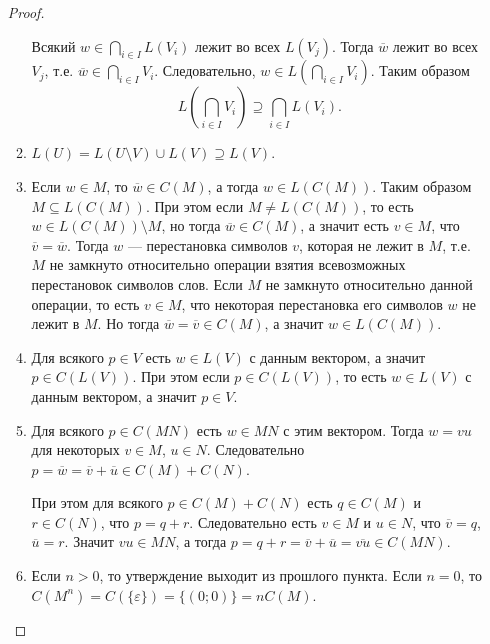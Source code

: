 \documentclass[12pt,a4paper]{article}
\begin{document}
\begin{problem}{8}
\begin{enumerate}
\begin{proof}
\begin{enumerate}
                            Всякий $w \in \bigcap_{i \in I} L(V_i)$ лежит во всех $L(V_j)$. Тогда $\overline{w}$ лежит во всех $V_j$, т.е. $\overline{w} \in \bigcap_{i \in I} V_i$. Следовательно, $w \in L\left(\bigcap_{i \in I} V_i\right)$. Таким образом
                            \[L\left(\bigcap_{i \in I} V_i\right) \supseteq \bigcap_{i \in I} L(V_i).\]

                        \item $L(U) = L(U \setminus V) \cup L(V) \supseteq L(V)$.
                        
                        \item Если $w \in M$, то $\overline{w} \in C(M)$, а тогда $w \in L(C(M))$. Таким образом $M \subseteq L(C(M))$. При этом если $M \neq L(C(M))$, то есть $w \in L(C(M)) \setminus M$, но тогда $\overline{w} \in C(M)$, а значит есть $v \in M$, что $\overline{v} = \overline{w}$. Тогда $w$ --- перестановка символов $v$, которая не лежит в $M$, т.е. $M$ не замкнуто относительно операции взятия всевозможных перестановок символов слов. Если $M$ не замкнуто относительно данной операции, то есть $v \in M$, что некоторая перестановка его символов $w$ не лежит в $M$. Но тогда $\overline{w} = \overline{v} \in C(M)$, а значит $w \in L(C(M))$.

                        \item Для всякого $p \in V$ есть $w \in L(V)$ с данным вектором, а значит $p \in C(L(V))$. При этом если $p \in C(L(V))$, то есть $w \in L(V)$ с данным вектором, а значит $p \in V$.

                        \item Для всякого $p \in C(MN)$ есть $w \in MN$ с этим вектором. Тогда $w = vu$ для некоторых $v \in M$, $u \in N$. Следовательно $p = \overline{w} = \overline{v} + \overline{u} \in C(M) + C(N)$.

                            При этом для всякого $p \in C(M) + C(N)$ есть $q \in C(M)$ и $r \in C(N)$, что $p = q + r$. Следовательно есть $v \in M$ и $u \in N$, что $\overline{v} = q$, $\overline{u} = r$. Значит $vu \in MN$, а тогда $p = q + r = \overline{v} + \overline{u} = \overline{vu} \in C(MN)$.
                        
                        \item Если $n > 0$, то утверждение выходит из прошлого пункта. Если $n = 0$, то $C(M^n) = C(\{\varepsilon\}) = \{(0; 0)\} = nC(M)$.
                        

\end{enumerate}
\end{proof}
\end{enumerate}
\end{problem}
\end{document}
